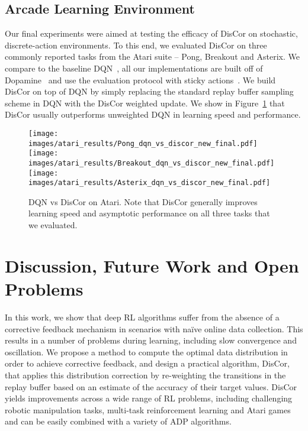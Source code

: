 \documentclass[jmlr]{article}
\begin{document}
\subsection{Arcade Learning Environment}
\label{sec:atari_exps}
Our final experiments were aimed at testing the efficacy of DisCor on stochastic, discrete-action environments. To this end, we evaluated DisCor on three commonly reported tasks from the Atari suite -- Pong, Breakout and Asterix.
We compare to the baseline DQN~\cite{Mnih2015}, all our implementations are built off of Dopamine~\cite{castro18dopamine} and use the evaluation protocol with sticky actions~\cite{machado18sticky}. We build DisCor on top of DQN by simply replacing the standard replay buffer sampling scheme in DQN with the DisCor weighted update. We show in Figure~\ref{fig:atari_results} that DisCor usually outperforms unweighted DQN in learning speed and performance. 
\begin{figure}[ht]
    \centering
    \texttt{[image: images/atari\_results/Pong\_dqn\_vs\_discor\_new\_final.pdf]}
    \texttt{[image: images/atari\_results/Breakout\_dqn\_vs\_discor\_new\_final.pdf]}
    \texttt{[image: images/atari\_results/Asterix\_dqn\_vs\_discor\_new\_final.pdf]}
    \caption{\footnotesize{DQN vs DisCor on Atari. Note that DisCor generally improves learning speed and asymptotic performance on all three tasks that we evaluated.}}
    \label{fig:atari_results}
\end{figure} \section{Discussion, Future Work and Open Problems}
In this work, we show that deep RL algorithms suffer from the absence of a corrective feedback mechanism in scenarios with na\"ive online data collection. This results in a number of problems during learning, including slow convergence and oscillation. We propose a method to compute the optimal data distribution in order to achieve corrective feedback, and design a practical algorithm, DisCor, that applies this distribution correction by re-weighting the transitions in the replay buffer based on an estimate of the accuracy of their target values. DisCor yields improvements across a wide range of RL problems, including challenging robotic manipulation tasks, multi-task reinforcement learning and Atari games and can be easily combined with a variety of ADP algorithms. 
\end{document}
